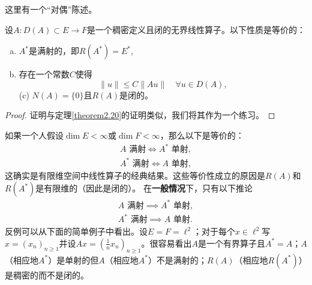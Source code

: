 这里有一个“对偶”陈述。
\begin{theorem}\label{theorem2.21_again}
设$A:D(A) \subset E \to F$是一个稠密定义且闭的无界线性算子。以下性质是等价的：
\begin{enumerate}[(a)]
    \item $A^*$是满射的，即$R(A^*)=E^*$,
    \item 存在一个常数$C$使得
    \[ \|u\| \leq C\|Au\| \quad \forall u \in D(A), \]
    (c) $N(A)=\{0\}$且$R(A)$是闭的。
\end{enumerate}
\end{theorem}
\begin{proof}
证明与定理\ref{theorem2.20}的证明类似，我们将其作为一个练习。
\end{proof}
\begin{remark}
如果一个人假设$\dim E < \infty$或$\dim F < \infty$，那么以下是等价的：
\begin{gather*}
A \text{ 满射} \iff A^* \text{ 单射}, \\
A^* \text{ 满射} \iff A \text{ 单射},
\end{gather*}
这确实是有限维空间中线性算子的经典结果。这些等价性成立的原因是$R(A)$和$R(A^*)$是有限维的（因此是闭的）。
在\textbf{一般情况}下，只有以下推论
\begin{gather*}
A \text{ 满射} \implies A^* \text{ 单射}, \\
A^* \text{ 满射} \implies A \text{ 单射}.
\end{gather*}
反例可以从下面的简单例子中看出。设$E=F=\ell^2$；对于每个$x \in \ell^2$写$x=(x_n)_{n \geq 1}$并设$Ax = (\frac{1}{n}x_n)_{n \geq 1}$。很容易看出$A$是一个有界算子且$A^*=A$；$A$（相应地$A^*$）是单射的但$A$（相应地$A^*$）不是满射的；$R(A)$（相应地$R(A^*)$）是稠密的而不是闭的。
\end{remark}


